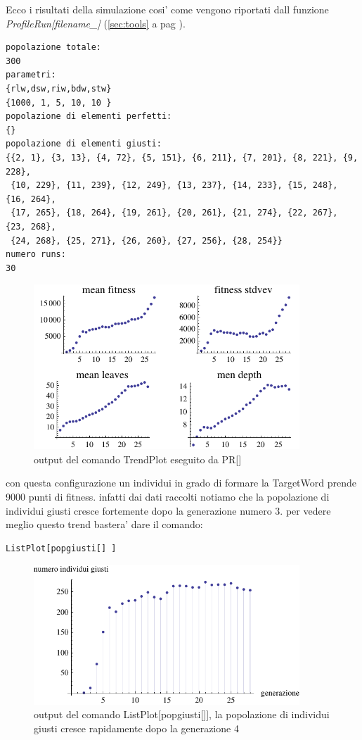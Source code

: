 \documentclass[12pt, a4paper]{article}
\begin{document}
Ecco i risultati della simulazione cosi' come vengono riportati dall funzione {\itshape ProfileRun[filename\_]} (\ref{sec:tools} a pag \pageref{sec:tools}).
\begin{lstlisting}
popolazione totale:
300
parametri:
{rlw,dsw,riw,bdw,stw}
{1000, 1, 5, 10, 10 }
popolazione di elementi perfetti: 
{}
popolazione di elementi giusti: 
{{2, 1}, {3, 13}, {4, 72}, {5, 151}, {6, 211}, {7, 201}, {8, 221}, {9, 228}, 
 {10, 229}, {11, 239}, {12, 249}, {13, 237}, {14, 233}, {15, 248}, {16, 264}, 
 {17, 265}, {18, 264}, {19, 261}, {20, 261}, {21, 274}, {22, 267}, {23, 268}, 
 {24, 268}, {25, 271}, {26, 260}, {27, 256}, {28, 254}}
numero runs:
30
\end{lstlisting}


\begin{figure}[!h]
\begin{center}
\includegraphics[width=10.0cm]{pr_expr1_run1.pdf}
\caption{output del comando TrendPlot eseguito da PR[]} 
\label{figure:prexpr1}
\end{center}
\end{figure}


con questa configurazione un individui in grado di formare la TargetWord prende 9000 punti di fitness.
infatti dai dati raccolti notiamo che la popolazione di individui giusti cresce fortemente dopo la generazione numero 3.
per vedere meglio questo trend bastera' dare il comando:
\begin{lstlisting}
ListPlot[popgiusti[] ]
\end{lstlisting}

\begin{figure}[!h]
\begin{center}
\includegraphics[width=10.0cm]{indgiusti_expr1_run1.pdf}
\caption{output del comando ListPlot[popgiusti[]], la popolazione di individui giusti cresce rapidamente dopo la generazione 4} 
\label{figure:plotpopgiusti1}
\end{center}
\end{figure}
\end{document}

